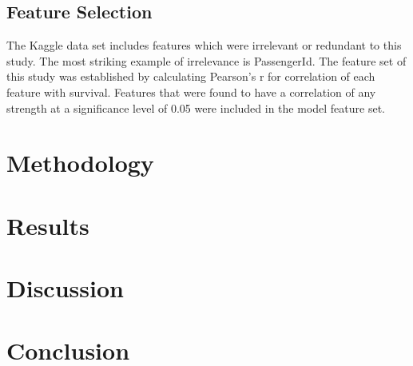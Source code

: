 \documentclass[10pt]{article}
\begin{document}
\begin{multicols}{2}
	
\subsection{Feature Selection}
	
	The Kaggle data set includes features which were irrelevant or redundant to this study.
	The most striking example of irrelevance is PassengerId.
	The feature set of this study was established by calculating Pearson's r for correlation of each feature with survival.
	Features that were found to have a correlation of any strength at a significance level of 0.05 were included in the model feature set.

\section{Methodology}

\section{Results}

\section{Discussion}

\section{Conclusion}\label{conclusions}

\end{multicols}
\end{document}
